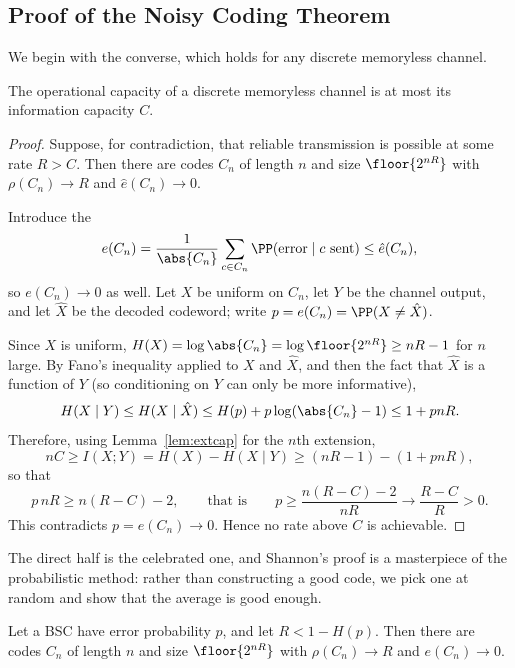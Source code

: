 \subsection{Proof of the Noisy Coding Theorem}\label{sec:noisycoding}

We begin with the converse, which holds for any discrete memoryless channel.

\begin{proposition}
	The operational capacity of a discrete memoryless channel is at most its information capacity $C$.
\end{proposition}

\begin{proof}
	Suppose, for contradiction, that reliable transmission is possible at some rate $R > C$. Then there are codes $C_n$ of length $n$ and size $\floor{2^{nR}}$ with $\rho(C_n)\to R$ and $\hat e(C_n)\to0$.

	Introduce the 
	$$e(C_n) = \frac{1}{\abs{C_n}}\sum_{c\in C_n}\PP(\text{error}\mid c\text{ sent}) \le \hat e(C_n),$$
	so $e(C_n)\to0$ as well. Let $X$ be uniform on $C_n$, let $Y$ be the channel output, and let $\hat X$ be the decoded codeword; write $p = e(C_n) = \PP(X \ne \hat X)$.

	Since $X$ is uniform, $H(X) = \log\abs{C_n} = \log\floor{2^{nR}} \ge nR-1$ for $n$ large. By Fano's inequality applied to $X$ and $\hat X$, and then the fact that $\hat X$ is a function of $Y$ (so conditioning on $Y$ can only be more informative),
	$$H(X\mid Y) \le H(X \mid \hat X) \le H(p)+p\log(\abs{C_n}-1) \le 1 + pnR.$$
	Therefore, using Lemma~\ref{lem:extcap} for the $n$th extension,
	$$nC \ge I(X;Y) = H(X)-H(X\mid Y) \ge (nR-1)-(1+pnR),$$
	so that
	$$p\,nR \ge n(R-C)-2, \qquad\text{that is}\qquad p \ge \frac{n(R-C)-2}{nR} \longrightarrow \frac{R-C}{R} > 0.$$
	This contradicts $p = e(C_n)\to0$. Hence no rate above $C$ is achievable.
\end{proof}

The direct half is the celebrated one, and Shannon's proof is a masterpiece of the probabilistic method: rather than constructing a good code, we pick one at random and show that the average is good enough.

\begin{proposition}\label{prop:randomcoding}
	Let a BSC have error probability $p$, and let $R < 1-H(p)$. Then there are codes $C_n$ of length $n$ and size $\floor{2^{nR}}$ with $\rho(C_n)\to R$ and $e(C_n)\to0$.
\end{proposition}

